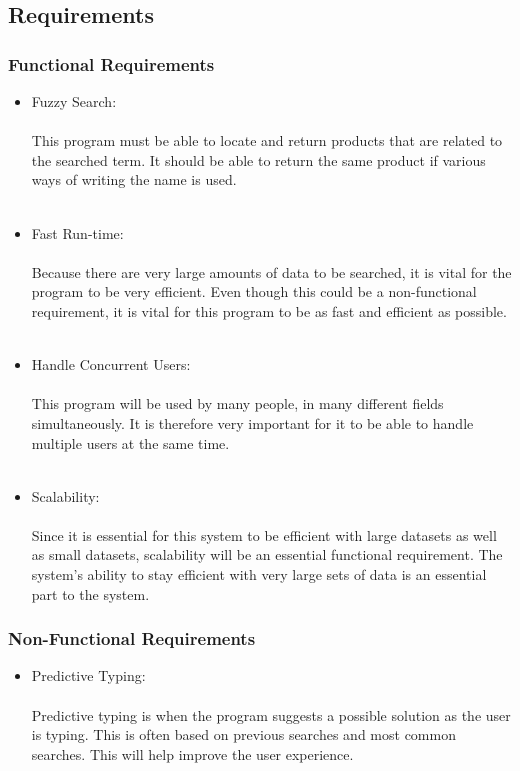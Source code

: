 \documentclass[a4paper,10pt]{article}
\begin{document}
{	\subsection{Requirements}
	\subsubsection{Functional Requirements} 
		\begin{itemize}
		\item Fuzzy Search:\\\\
			This program must be able to locate and return products that are related to the searched term. It should be able to return the same product if various ways of writing the name is used.\\\\
	
		\item Fast Run-time:\\\\
			Because there are very large amounts of data to be searched, it is vital for the program to be very efficient.  Even though this could be a non-functional requirement, it is vital for this program to be as fast and efficient as possible.\\\\
	
		\item Handle Concurrent Users:\\\\
			This program will be used by many people, in many different fields simultaneously. It is therefore very important for it to be able to handle multiple users at the same time.\\\\
	
		\item Scalability:\\\\
			Since it is essential for this system to be efficient with large datasets as well as small datasets, scalability will be an essential functional requirement. The system’s ability to stay efficient with very large sets of data is an essential part to the system.
		 \end{itemize}

	\subsubsection{Non-Functional Requirements}
		\begin{itemize}
		\item Predictive Typing:\\\\
			Predictive typing is when the program suggests a possible solution as the user is typing. This is often based on previous searches and most common searches. This will help improve the user experience. \\\\


\end{itemize}}
\end{document}
